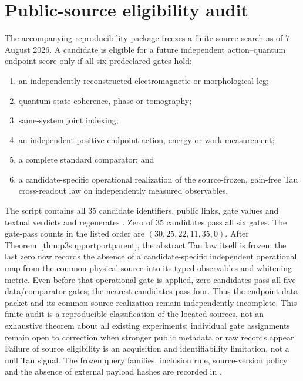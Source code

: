 \section{Public-source eligibility audit}

The accompanying reproducibility package freezes a finite source search as of
7 August 2026.  A candidate is eligible for a future independent
action--quantum endpoint score only if all six predeclared gates hold:
\begin{enumerate}[nosep]
\item an independently reconstructed electromagnetic or morphological leg;
\item quantum-state coherence, phase or tomography;
\item same-system joint indexing;
\item an independent positive endpoint action, energy or work measurement;
\item a complete standard comparator; and
\item a candidate-specific operational realization of the source-frozen,
gain-free Tau cross-readout law on independently measured observables.
\end{enumerate}
The script  contains all
35 candidate identifiers, public links, gate values and textual verdicts and
regenerates
.  Zero of 35
candidates pass all six gates.  The gate-pass counts in the listed order are
$(30,25,22,11,35,0)$.  After
Theorem~\ref{thm:p3supportportparent}, the abstract Tau law itself is frozen;
the last zero now records the absence of a candidate-specific independent
operational map from the common physical source into its typed observables and
whitening metric.  Even before that operational gate is applied, zero
candidates pass all five data/comparator gates; the nearest candidates pass
four.  Thus the endpoint-data packet and its common-source realization remain
independently incomplete.  This finite audit is a reproducible
classification of the located sources, not an exhaustive theorem about all
existing experiments; individual gate assignments remain open to correction
when stronger public metadata or raw records appear.  Failure of source
eligibility is an acquisition and identifiability limitation, not a null Tau
signal.  The frozen query families, inclusion rule, source-version policy and
the absence of external payload hashes are recorded in
.

